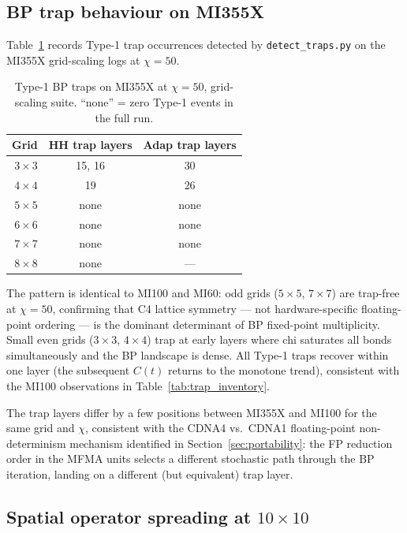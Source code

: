 \subsection*{BP trap behaviour on MI355X}

Table~\ref{tab:traps_mi355x} records Type-1 trap occurrences detected by
\texttt{detect\_traps.py} on the MI355X grid-scaling logs at $\chi=50$.

\begin{table}[ht]
\centering
\caption{Type-1 BP traps on MI355X at $\chi=50$, grid-scaling suite.
  ``none'' = zero Type-1 events in the full run.}
\label{tab:traps_mi355x}
\smallskip
\small
\begin{tabular}{r cc}
\toprule
Grid    & HH trap layers & Adap trap layers \\
\midrule
$3\times3$ & 15, 16         & 30               \\
$4\times4$ & 19             & 26               \\
$5\times5$ & none           & none             \\
$6\times6$ & none           & none             \\
$7\times7$ & none           & none             \\
$8\times8$ & none           & ---              \\
\bottomrule
\end{tabular}
\end{table}

The pattern is identical to MI100 and MI60: odd grids ($5\times5$, $7\times7$)
are trap-free at $\chi=50$, confirming that C4 lattice symmetry --- not
hardware-specific floating-point ordering --- is the dominant determinant of BP
fixed-point multiplicity.
Small even grids ($3\times3$, $4\times4$) trap at early layers where chi
saturates all bonds simultaneously and the BP landscape is dense.
All Type-1 traps recover within one layer (the subsequent $C(t)$ returns to the
monotone trend), consistent with the MI100 observations in
Table~\ref{tab:trap_inventory}.

The trap layers differ by a few positions between MI355X and MI100 for the same
grid and $\chi$, consistent with the CDNA4 vs.\ CDNA1 floating-point non-determinism
mechanism identified in Section~\ref{sec:portability}: the FP reduction order in
the MFMA units selects a different stochastic path through the BP iteration,
landing on a different (but equivalent) trap layer.

\subsection*{Spatial operator spreading at $10\times10$}


